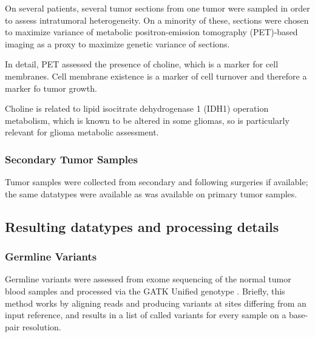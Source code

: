 On several patients, several tumor sections from one tumor were
sampled in order to assess intratumoral heterogeneity. On a minority
of these, sections were chosen to maximize variance of metabolic
positron-emission tomography (PET)-based imaging as a proxy to maximize genetic variance of sections.

In detail, PET assessed the presence of choline, which is a marker
for cell membranes. Cell membrane existence is a marker of cell
turnover and therefore a marker fo tumor growth.

Choline is related to lipid isocitrate dehydrogenase 1 (IDH1)
operation metabolism, which is known to be altered in some gliomas, so
is particularly relevant for glioma metabolic assessment. 



\subsubsection{Secondary Tumor Samples}

Tumor samples were collected from secondary and following surgeries if
available; the same datatypes were available as was available on
primary tumor samples.

\subsection{Resulting datatypes and processing details}
\subsubsection{Germline Variants}
Germline variants were assessed from exome sequencing of the normal
tumor blood samples and processed via the GATK Unified genotype
. Briefly, this method works by aligning reads and
producing variants at sites differing from an input reference, and
results in a list of called variants for every sample on a base-pair
resolution.


